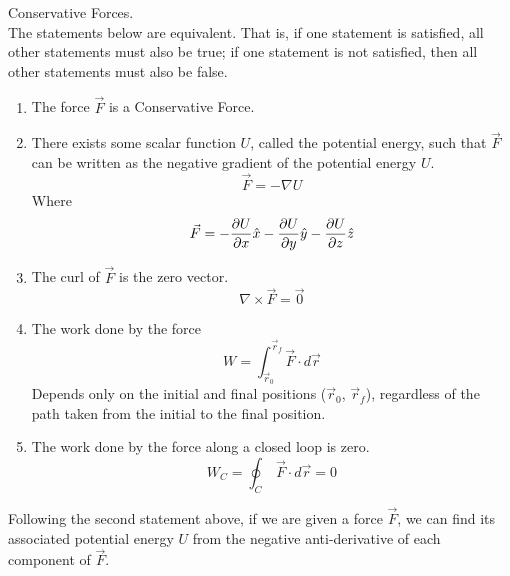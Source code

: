 \documentclass[11pt]{article}
\theoremstyle{gangnamstyle}{\newtheorem{definition}{Definition}[]}
\theoremstyle{gangnamstyle}{\newtheorem{example}{Example}[]}
\theoremstyle{gangnamstyle}{\newtheorem{problem}{Problem}[]}
\begin{document}
\begin{definition}
Conservative Forces. \\
The statements below are equivalent. That is, if one statement is satisfied, all other statements must also be true; if one statement is not satisfied, then all other statements must also be false. 
\begin{enumerate}
\item The force $\Vec{F}$ is a Conservative Force. 
\item There exists some scalar function $U$, called the potential energy, such that $\Vec{F}$ can be written as the negative gradient of the potential energy $U$. 
\begin{equation}
\Vec{F} = - \nabla U
\end{equation}
Where
\begin{equation}
\Vec{F} = - \frac{\partial U}{\partial x}\Hat{x} - \frac{\partial U}{\partial y}\Hat{y} - \frac{\partial U}{\partial z}\Hat{z}
\end{equation}
\item The curl of $\Vec{F}$ is the zero vector. 
\begin{equation}
\nabla \times \Vec{F} = \Vec{0}
\end{equation}
\item The work done by the force 
\begin{equation}
W = \int_{\Vec{r}_0}^{\Vec{r}_f} \Vec{F} \cdot d\Vec{r}
\end{equation}
Depends only on the initial and final positions (${\Vec{r}_0}$, ${\Vec{r}_f}$), regardless of the path taken from the initial to the final position. 
\item The work done by the force along a closed loop is zero. 
\begin{equation}
W_C = \oint_C \ \Vec{F} \cdot d\Vec{r} = 0
\end{equation}
\end{enumerate}
\end{definition}

Following the second statement above, if we are given a force $\Vec{F}$, we can find its associated potential energy $U$ from the negative anti-derivative of each component of $\Vec{F}$. 
\end{document}

